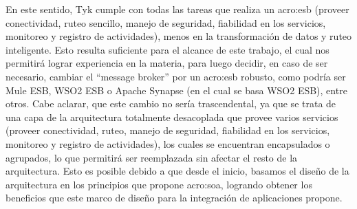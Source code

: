 En este sentido, Tyk cumple con todas las tareas que realiza un \gls{acro:esb} (proveer conectividad, ruteo sencillo, manejo de seguridad, fiabilidad en los servicios, monitoreo y registro de actividades), menos en la transformación de datos y ruteo inteligente.  Esto resulta suficiente para el alcance de este trabajo, el cual nos permitirá lograr experiencia en la materia, para luego decidir, en caso de ser necesario, cambiar el ``message broker'' por un \gls{acro:esb} robusto, como podría ser Mule ESB, WSO2 ESB o Apache Synapse (en el cual se basa WSO2 ESB), entre otros.  Cabe aclarar, que este cambio no sería trascendental, ya que se trata de una capa de la arquitectura totalmente desacoplada que provee varios servicios (proveer conectividad, ruteo, manejo de seguridad, fiabilidad en los servicios, monitoreo y registro de actividades), los cuales se encuentran encapsulados o agrupados, lo que permitirá ser reemplazada sin afectar el resto de la arquitectura.  Esto es posible debido a que desde el inicio, basamos el diseño de la arquitectura en los principios que propone \gls{acro:soa}, logrando obtener los beneficios que este marco de diseño para la integración de aplicaciones propone.
